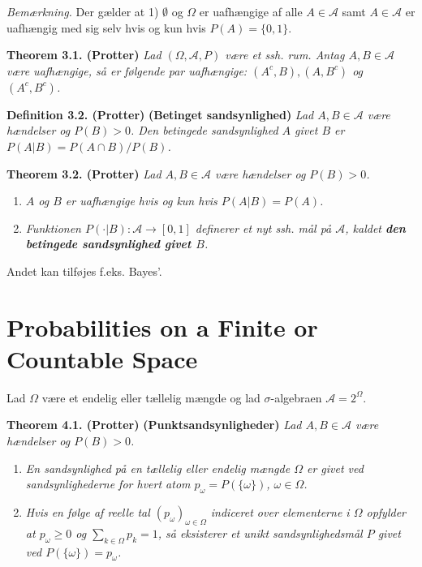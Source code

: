 \documentclass[a4paper,12pt,openany]{book}
\providecommand{\tightlist}{%
 \setlength{\itemsep}{0pt}\setlength{\parskip}{0pt}}
\begin{document}
\emph{Bemærkning.} Der gælder at 1) \(\emptyset\) og \(\Omega\) er uafhængige af alle \(A\in\mathcal{A}\) samt \(A\in\mathcal{A}\) er uafhængig med sig selv hvis og kun hvis \(P(A)=\{0,1\}\).

\textbf{Theorem 3.1. (Protter)} \emph{Lad \((\Omega,\mathcal{A},P)\) være et ssh. rum. Antag \(A,B\in\mathcal{A}\) være uafhængige, så er følgende par uafhængige: \((A^c,B),(A,B^c)\) og \((A^c,B^c)\).}

\textbf{Definition 3.2. (Protter)} \textbf{(Betinget sandsynlighed)} \emph{Lad \(A,B\in\mathcal{A}\) være hændelser og \(P(B)>0\). Den betingede sandsynlighed \(A\) givet \(B\) er \(P(A\vert B)=P(A\cap B)/P(B)\).}

\textbf{Theorem 3.2. (Protter)} \emph{Lad \(A,B\in\mathcal{A}\) være hændelser og \(P(B)>0\).}

\begin{enumerate}
\def\labelenumi{\alph{enumi}.}
\tightlist
\item
  \emph{\(A\) og \(B\) er uafhængige hvis og kun hvis \(P(A\vert B)=P(A)\).}
\item
  \emph{Funktionen \(P(\cdot \vert B) : \mathcal{A} \to [0,1]\) definerer et nyt ssh. mål på \(\mathcal{A}\), kaldet \textbf{den betingede sandsynlighed givet \(B\)}.}
\end{enumerate}

Andet kan tilføjes f.eks. Bayes'.

\hypertarget{probabilities-on-a-finite-or-countable-space}{%
\section{Probabilities on a Finite or Countable Space}\label{probabilities-on-a-finite-or-countable-space}}

Lad \(\Omega\) være et endelig eller tællelig mængde og lad \(\sigma\)-algebraen \(\mathcal{A}=2^\Omega\).

\textbf{Theorem 4.1. (Protter)} \textbf{(Punktsandsynligheder)} \emph{Lad \(A,B\in\mathcal{A}\) være hændelser og \(P(B)>0\).}

\begin{enumerate}
\def\labelenumi{\alph{enumi}.}
\tightlist
\item
  \emph{En sandsynlighed på en tællelig eller endelig mængde \(\Omega\) er givet ved sandsynlighederne for hvert atom \(p_\omega=P(\{\omega\})\), \(\omega\in\Omega\).}
\item
  \emph{Hvis en følge af reelle tal \((p_\omega)_{\omega\in\Omega}\) indiceret over elementerne i \(\Omega\) opfylder at \(p_\omega\ge0\) og \(\sum_{k\in\Omega}p_k=1\), så eksisterer et unikt sandsynlighedsmål \(P\) givet ved \(P(\{\omega\})=p_\omega\).}
\end{enumerate}
\end{document}
